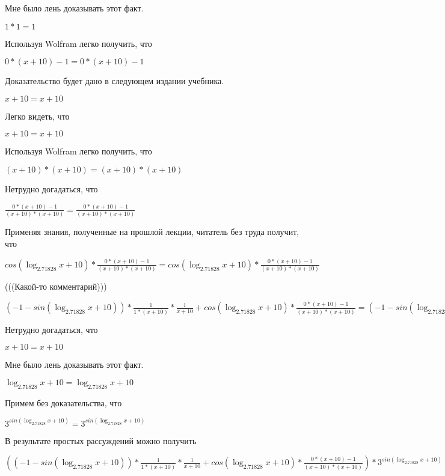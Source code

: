 \documentclass[12pt,a4paper,fleqn]{article}
\theoremstyle{definition}
\begin{document}
Мне было лень доказывать этот факт.

$ 1  *  1  =  1 $

Используя Wolfram легко получить, что 

$ 0  * ( x  +  10 ) -  1  =  0  * ( x  +  10 ) -  1 $

Доказательство будет дано в следующем издании учебника. 

$ x  +  10  =  x  +  10 $

Легко видеть, что 

$ x  +  10  =  x  +  10 $

Используя Wolfram легко получить, что 

$( x  +  10 ) * ( x  +  10 ) = ( x  +  10 ) * ( x  +  10 )$

Нетрудно догадаться, что 

$\frac{ 0  * ( x  +  10 ) -  1 }{( x  +  10 ) * ( x  +  10 )}
 = \frac{ 0  * ( x  +  10 ) -  1 }{( x  +  10 ) * ( x  +  10 )}
$

Применяя знания, полученные на прошлой лекции, читатель без труда получит, что 

$cos(\log_{ 2.71828 }{ x  +  10 }) * \frac{ 0  * ( x  +  10 ) -  1 }{( x  +  10 ) * ( x  +  10 )}
 = cos(\log_{ 2.71828 }{ x  +  10 }) * \frac{ 0  * ( x  +  10 ) -  1 }{( x  +  10 ) * ( x  +  10 )}
$

(((Какой-то комментарий))) 

$( -1  - sin(\log_{ 2.71828 }{ x  +  10 })) * \frac{ 1 }{ 1  * ( x  +  10 )}
 * \frac{ 1 }{ x  +  10 }
 + cos(\log_{ 2.71828 }{ x  +  10 }) * \frac{ 0  * ( x  +  10 ) -  1 }{( x  +  10 ) * ( x  +  10 )}
 = ( -1  - sin(\log_{ 2.71828 }{ x  +  10 })) * \frac{ 1 }{ 1  * ( x  +  10 )}
 * \frac{ 1 }{ x  +  10 }
 + cos(\log_{ 2.71828 }{ x  +  10 }) * \frac{ 0  * ( x  +  10 ) -  1 }{( x  +  10 ) * ( x  +  10 )}
$

Нетрудно догадаться, что 

$ x  +  10  =  x  +  10 $

Мне было лень доказывать этот факт.

$\log_{ 2.71828 }{ x  +  10 } = \log_{ 2.71828 }{ x  +  10 }$

Примем без доказательства, что 

${ 3 }^{sin(\log_{ 2.71828 }{ x  +  10 })} = { 3 }^{sin(\log_{ 2.71828 }{ x  +  10 })}$

В результате простых рассуждений можно получить 

$(( -1  - sin(\log_{ 2.71828 }{ x  +  10 })) * \frac{ 1 }{ 1  * ( x  +  10 )}
 * \frac{ 1 }{ x  +  10 }
 + cos(\log_{ 2.71828 }{ x  +  10 }) * \frac{ 0  * ( x  +  10 ) -  1 }{( x  +  10 ) * ( x  +  10 )}
) * { 3 }^{sin(\log_{ 2.71828 }{ x  +  10 })} = (( -1  - sin(\log_{ 2.71828 }{ x  +  10 })) * \frac{ 1 }{ 1  * ( x  +  10 )}
 * \frac{ 1 }{ x  +  10 }
 + cos(\log_{ 2.71828 }{ x  +  10 }) * \frac{ 0  * ( x  +  10 ) -  1 }{( x  +  10 ) * ( x  +  10 )}
) * { 3 }^{sin(\log_{ 2.71828 }{ x  +  10 })}$
\end{document}
